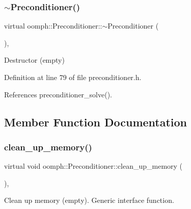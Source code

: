 \subsubsection{\texorpdfstring{$\sim$\+Preconditioner()}{~Preconditioner()}}
{\footnotesize\ttfamily virtual oomph\+::\+Preconditioner\+::$\sim$\+Preconditioner (\begin{DoxyParamCaption}{ }\end{DoxyParamCaption})\hspace{0.3cm}{\ttfamily [inline]}, {\ttfamily [virtual]}}



Destructor (empty) 



Definition at line 79 of file preconditioner.\+h.



References preconditioner\+\_\+solve().



\subsection{Member Function Documentation}
\mbox{\label{classoomph_1_1Preconditioner_a46c31c416829bedcd9db238431262027}} 
\subsubsection{\texorpdfstring{clean\+\_\+up\+\_\+memory()}{clean\_up\_memory()}}
{\footnotesize\ttfamily virtual void oomph\+::\+Preconditioner\+::clean\+\_\+up\+\_\+memory (\begin{DoxyParamCaption}{ }\end{DoxyParamCaption})\hspace{0.3cm}{\ttfamily [inline]}, {\ttfamily [virtual]}}



Clean up memory (empty). Generic interface function. 



